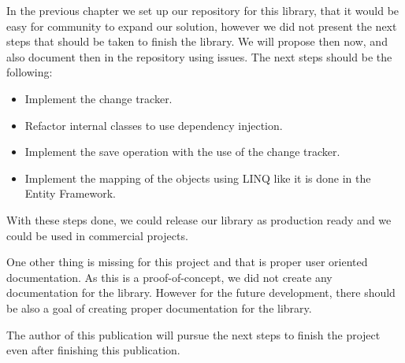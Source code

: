 In the previous chapter we set up our repository for this library, that it would be easy for community to expand our solution, however we did not present the next steps that should be
taken to finish the library. We will propose then now, and also document then in the repository using issues. The next steps should be the following:
\begin{itemize}
    \item {Implement the change tracker.}
    \item {Refactor internal classes to use dependency injection.}
    \item {Implement the save operation with the use of the change tracker.}
    \item {Implement the mapping of the objects using LINQ like it is done in the Entity Framework.}
\end{itemize}
With these steps done, we could release our library as production ready and we could be used in commercial projects.

One other thing is missing for this project and that is proper user oriented documentation. As this is a proof-of-concept, we did not create any documentation for the library.
However for the future development, there should be also a goal of creating proper documentation for the library.

The author of this publication will pursue the next steps to finish the project even after finishing this publication.